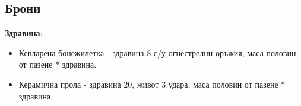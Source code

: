 \subsection{Брони}
\textbf{Здравина}:
\begin{itemize}[topsep=-0cm, partopsep=0cm, parsep=0cm, itemsep=0cm]
\item{Кевларена бонежилетка - здравина 8 с/у огнестрелни оръжия, маса половин от пазене * здравина.}
\item{Керамична прола - здравина 20, живот 3 удара, маса половин от пазене * здравина.}
\end{itemize}
